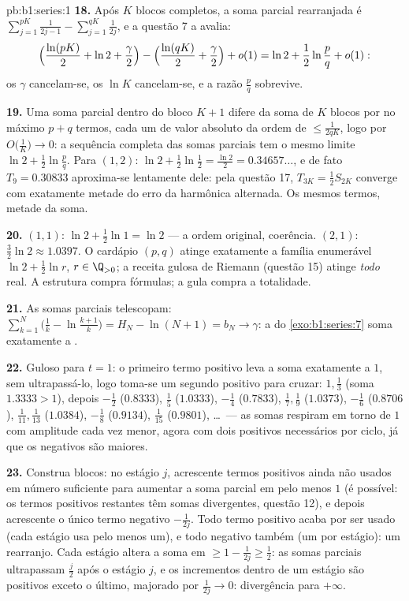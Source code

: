 \begin{solution}{pb:b1:series:1}
\textbf{18.} Após $K$ blocos completos, a soma parcial rearranjada
é $\sum_{j=1}^{pK}\frac{1}{2j-1} -
\sum_{j=1}^{qK}\frac{1}{2j}$, e a questão 7 a avalia:
\[
\Bigl(\frac{\ln(pK)}{2} + \ln 2 + \frac\gamma2\Bigr)
- \Bigl(\frac{\ln(qK)}{2} + \frac\gamma2\Bigr) + o(1)
= \ln 2 + \frac12\ln\frac pq + o(1) :
\]
os $\gamma$ cancelam-se, os $\ln K$ cancelam-se, e a razão
$\frac pq$ sobrevive.

\textbf{19.} Uma soma parcial dentro do bloco $K + 1$ difere da
soma de $K$ blocos por no máximo $p + q$ termos, cada um de valor
absoluto da ordem de $\leq \frac{1}{2qK}$, logo por $O\bigl(\frac1K\bigr) \to 0$:
a sequência completa das somas parciais tem o mesmo limite $\ln 2 +
\frac12\ln\frac pq$.
Para $(1, 2)$: $\ln 2 + \frac12\ln\frac12 =
\frac{\ln 2}{2} = 0.34657\dots$, e de fato $T_9 = 0.30833$
aproxima-se lentamente dele: pela questão 17, $T_{3K} = \frac12 S_{2K}$
converge com exatamente metade do erro da harmônica alternada.
Os mesmos termos, metade da soma.

\textbf{20.} $(1,1)$: $\ln 2 + \frac12\ln 1 = \ln 2$ --- a ordem
original, coerência. $(2,1)$: $\frac32\ln 2 \approx
1.0397$. O cardápio $(p,q)$ atinge
exatamente a família enumerável  $\ln 2 + \frac12\ln r$, $r \in \Q_{>0}$; a receita
gulosa de Riemann (questão 15) atinge \emph{todo} real. A
estrutura compra fórmulas; a gula compra a totalidade.

\textbf{21.} As somas parciais telescopam: $\sum_{k=1}^{N}
\bigl(\frac1k - \ln\frac{k+1}{k}\bigr) = H_N - \ln(N+1) = b_N
\to \gamma$: a  do \cref{exo:b1:series:7}
soma exatamente a .

\textbf{22.} Guloso para $t = 1$: o primeiro termo positivo leva a
soma exatamente a $1$, sem ultrapassá-lo, logo toma-se um segundo
positivo para cruzar: $1, \frac13$ (soma $1.3333 > 1$), depois
$-\frac12$ ($0.8333$), $\frac15$ ($1.0333$), $-\frac14$
($0.7833$), $\frac17, \frac19$ ($1.0373$), $-\frac16$
($0.8706$), $\frac1{11}, \frac1{13}$ ($1.0384$), $-\frac18$
($0.9134$), $\frac1{15}$ ($0.9801$), \dots\ --- as somas respiram
em torno de $1$ com amplitude cada vez menor, agora com dois
positivos necessários por ciclo, já que os negativos são maiores.

\textbf{23.} Construa blocos: no estágio $j$, acrescente termos
positivos ainda não usados em número suficiente para aumentar a
soma parcial em pelo menos $1$ (é possível: os termos positivos
restantes têm somas divergentes, questão 12), e depois acrescente
o único termo negativo $-\frac{1}
{2j}$. Todo termo positivo acaba por ser
usado (cada estágio usa pelo menos um), e todo negativo também
(um por estágio): um rearranjo. Cada estágio altera a soma em
$\geq 1 -
\frac{1}{2j} \geq \frac12$: as somas parciais ultrapassam
$\frac{j}{2}$ após o estágio $j$, e os incrementos dentro de um estágio
são positivos exceto o último, majorado por $\frac{1}{2j} \to 0$:
divergência para $+\infty$.


\end{solution}
